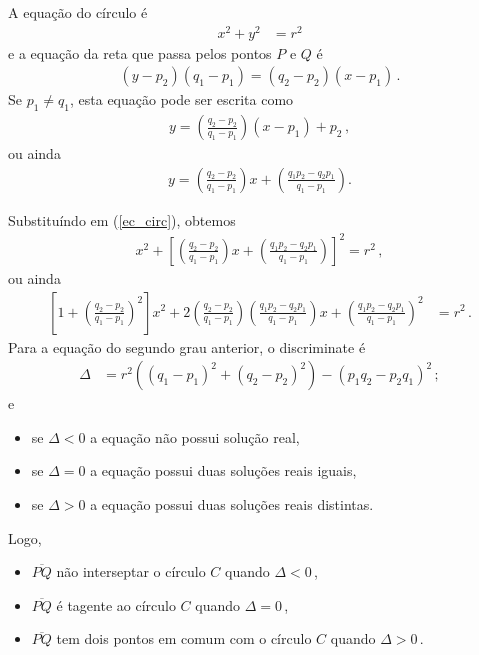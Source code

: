 A equação do círculo é
\begin{align}
    x^2 + y^2 &= r^2
    \label{ec_circ}
\end{align}
e a equação da reta que passa pelos pontos $P$ e $Q$ é
\begin{align*}
    (y-p_2)(q_1-p_1)=(q_2-p_2)(x-p_1)\,.
\end{align*}
Se $p_1\neq q_1$, esta equação pode ser escrita como
\begin{align*}
    y=\left(\frac{q_2-p_2}{q_1-p_1}\right)\left(x-p_1\right)+p_2\,,
\end{align*}
ou ainda
\begin{align*}
    y = \left( \frac{q_2 - p_2}{q_1 - p_1} \right)x + \left(
    \frac{q_1 p_2 - q_2 p_1}{q_1 - p_1} \right).
\end{align*}

Substituíndo em (\ref{ec_circ}), obtemos
\begin{align*}
    x^2  + \left[ \left( \frac{q_2 - p_2}{q_1 - p_1} \right) x + \left(
    \frac{q_1 p_2 - q_2 p_1}{q_1 - p_1} \right) \right]^2  = r^2\,,
\end{align*}
ou ainda
\begin{align*}
    \left[ 1 + \left( \frac{q_2 - p_2}{q_1 - p_1} \right)^2 \right] x^2 +
    2 \left( \frac{q_2 - p_2}{q_1 - p_1} \right) \left( \frac{q_1 p_2 - q_2
    p_1}{q_1 - p_1} \right) x + \left( 
    \frac{q_1 p_2 - q_2 p_1}{q_1 - p_1} \right)^2 & = r^2\,.
\end{align*}
Para a equação do segundo grau anterior, o discriminate é
\begin{align*}
    \Delta &= r^2 \left( \left( q_1 - p_1 \right)^2 + \left( q_2 - p_2
    \right)^2 \right) - \left( p_1 q_2 - p_2 q_1 \right)^2\,;
\end{align*}
e
\begin{itemize}
    \item se $\Delta < 0$ a equação não possui solução real,
    \item se $\Delta = 0$ a equação possui duas soluções reais iguais,
    \item se $\Delta > 0$ a equação possui duas soluções reais distintas.
\end{itemize}
Logo,
\begin{itemize}
    \item $\overline{PQ}$ não interseptar o círculo $C$ quando $\Delta < 0$\,,
    \item $\overline{PQ}$ é tagente ao círculo $C$ quando $\Delta = 0$\,,
    \item $\overline{PQ}$ tem dois pontos em comum com o círculo $C$ quando
        $\Delta > 0$\,.
\end{itemize}

